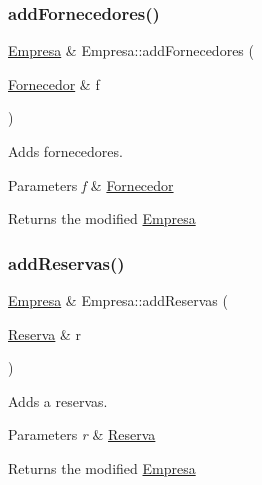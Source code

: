 \subsubsection{\texorpdfstring{add\+Fornecedores()}{addFornecedores()}}
{\footnotesize\ttfamily \hyperlink{classEmpresa}{Empresa} \& Empresa\+::add\+Fornecedores (\begin{DoxyParamCaption}\item[{\hyperlink{classFornecedor}{Fornecedor} \&}]{f }\end{DoxyParamCaption})}



Adds fornecedores. 


\begin{DoxyParams}{Parameters}
{\em f} & \hyperlink{classFornecedor}{Fornecedor}\\
\hline
\end{DoxyParams}
\begin{DoxyReturn}{Returns}
the modified \hyperlink{classEmpresa}{Empresa} 
\end{DoxyReturn}
\mbox{\label{classEmpresa_a42a1671b234ab8380cfb2ed33517edb2}} 
\subsubsection{\texorpdfstring{add\+Reservas()}{addReservas()}}
{\footnotesize\ttfamily \hyperlink{classEmpresa}{Empresa} \& Empresa\+::add\+Reservas (\begin{DoxyParamCaption}\item[{\hyperlink{classReserva}{Reserva} \&}]{r }\end{DoxyParamCaption})}



Adds a reservas. 


\begin{DoxyParams}{Parameters}
{\em r} & \hyperlink{classReserva}{Reserva}\\
\hline
\end{DoxyParams}
\begin{DoxyReturn}{Returns}
the modified \hyperlink{classEmpresa}{Empresa} 
\end{DoxyReturn}
\mbox{\label{classEmpresa_a52b9f4d94c2a05704d74854ed4dd1590}} 
